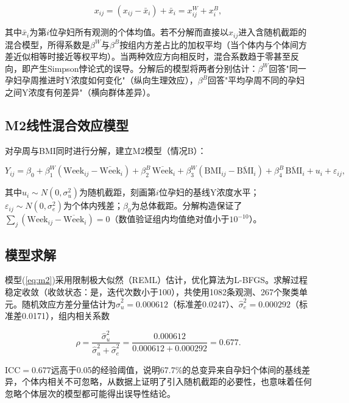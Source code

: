 \documentclass[12pt,a4paper]{ctexart}
\begin{document}
\begin{equation}
x_{ij} = (x_{ij}-\bar{x}_i) + \bar{x}_i = x_{ij}^{W} + x_i^{B},
\end{equation}

其中$\bar{x}_i$为第$i$位孕妇所有观测的个体均值。若不分解而直接以$x_{ij}$进入含随机截距的混合模型，所得系数是$\beta^{W}$与$\beta^{B}$按组内方差占比的加权平均（当个体内与个体间方差近似相等时接近等权平均）。当两种效应方向相反时，混合系数趋于零甚至反向，即产生Simpson悖论式的误导\cite{simpson,neuhaus,bell}。分解后的模型将两者分别估计：$\beta^{W}$回答"同一孕妇孕周推进时Y浓度如何变化"（纵向生理效应），$\beta^{B}$回答"平均孕周不同的孕妇之间Y浓度有何差异"（横向群体差异）。

\subsection{M2线性混合效应模型}

对孕周与BMI同时进行分解，建立M2模型（情况B）：

\begin{equation}
Y_{ij} = \beta_0 + \beta_1^W(\mathrm{Week}_{ij}-\overline{\mathrm{Week}}_i) + \beta_2^B\,\overline{\mathrm{Week}}_i + \beta_3^W(\mathrm{BMI}_{ij}-\overline{\mathrm{BMI}}_i) + \beta_4^B\,\overline{\mathrm{BMI}}_i + u_i + \varepsilon_{ij},
\label{eq:m2}
\end{equation}

其中$u_i\sim N(0,\sigma_u^2)$为随机截距，刻画第$i$位孕妇的基线Y浓度水平；$\varepsilon_{ij}\sim N(0,\sigma_e^2)$为个体内残差；$\beta_0$为总体截距。分解构造保证了$\sum_j(\mathrm{Week}_{ij}-\overline{\mathrm{Week}}_i)=0$（数值验证组内均值绝对值小于$10^{-10}$）。

\subsection{模型求解}

模型(\ref{eq:m2})采用限制极大似然（REML）估计，优化算法为L-BFGS\cite{fitzmaurice}。求解过程稳定收敛（收敛状态：是，迭代次数小于100），共使用1082条观测、267个聚类单元。随机效应方差分量估计为$\hat{\sigma}_u^2=0.000612$（标准差0.0247）、$\hat{\sigma}_e^2=0.000292$（标准差0.0171），组内相关系数

\begin{equation}
\rho = \frac{\hat{\sigma}_u^2}{\hat{\sigma}_u^2+\hat{\sigma}_e^2} = \frac{0.000612}{0.000612+0.000292} = 0.677 .
\end{equation}

ICC$=0.677$远高于0.05的经验阈值，说明67.7\%的总变异来自孕妇个体间的基线差异，个体内相关不可忽略，从数据上证明了引入随机截距的必要性，也意味着任何忽略个体层次的模型都可能得出误导性结论。
\end{document}
